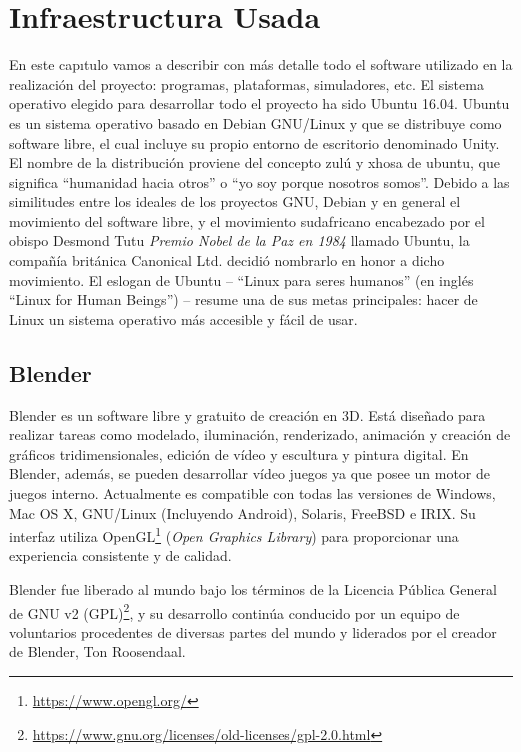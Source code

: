 \chapter{Infraestructura Usada}
\label{ch:infraestructura}

En este capıtulo vamos a describir con más detalle todo el software utilizado en la realización del proyecto: programas, plataformas, simuladores, etc. El sistema operativo elegido para desarrollar todo el proyecto ha sido Ubuntu 16.04. Ubuntu es un sistema operativo basado en Debian GNU/Linux y que se distribuye como software libre, el cual incluye su propio entorno de escritorio denominado Unity. El nombre de la distribución proviene del concepto zulú y xhosa de ubuntu, que significa “humanidad hacia otros” o “yo soy porque nosotros somos”. Debido a las similitudes entre los ideales de los proyectos GNU, Debian y en general el movimiento del software libre, y el movimiento sudafricano encabezado por el obispo Desmond Tutu \textit{Premio Nobel de la Paz en 1984} llamado Ubuntu, la compañía británica Canonical Ltd. decidió nombrarlo en honor a dicho movimiento. El eslogan de Ubuntu – “Linux para seres humanos” (en inglés “Linux for Human Beings”) – resume una de sus metas principales: hacer de Linux un sistema operativo más accesible y fácil de usar.

\section{Blender}
\label{sec:inf_blender}

Blender\cite{blender} es un software libre y gratuito de creación en 3D. Está diseñado para realizar tareas como modelado, iluminación, renderizado, animación y creación de gráficos tridimensionales, edición de vídeo y escultura y pintura digital. En Blender, además, se pueden desarrollar vídeo juegos ya que posee un motor de juegos interno. Actualmente es compatible con todas las versiones de Windows, Mac OS X, GNU/Linux (Incluyendo Android), Solaris, FreeBSD e IRIX. Su interfaz utiliza OpenGL\footnote{\url{https://www.opengl.org/}} (\textit{Open Graphics Library}) para proporcionar una experiencia consistente y de calidad.

Blender fue liberado al mundo bajo los términos de la Licencia Pública General de GNU v2 (GPL)\footnote{\url{https://www.gnu.org/licenses/old-licenses/gpl-2.0.html}}, y su desarrollo continúa conducido por un equipo de voluntarios procedentes de diversas partes del mundo y liderados por el creador de Blender, Ton Roosendaal. 


